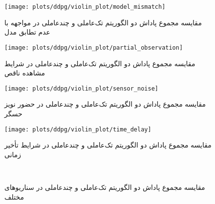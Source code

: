 \begin{figure}[H]
	\centering
	\texttt{[image: plots/ddpg/violin\_plot/model\_mismatch]}
	\caption{مقایسه مجموع پاداش دو الگوریتم تک‌عاملی و چندعاملی  در مواجهه با عدم تطابق مدل}
\end{figure}

\begin{figure}[H]
	\centering
	\texttt{[image: plots/ddpg/violin\_plot/partial\_observation]}
	\caption{مقایسه مجموع پاداش دو الگوریتم تک‌عاملی و چندعاملی  در شرایط مشاهده ناقص}
\end{figure}

\begin{figure}[H]
	\centering
	\texttt{[image: plots/ddpg/violin\_plot/sensor\_noise]}
	\caption{مقایسه مجموع پاداش دو الگوریتم تک‌عاملی و چندعاملی  در حضور نویز حسگر}
\end{figure}

\begin{figure}[H]
	\centering
	\texttt{[image: plots/ddpg/violin\_plot/time\_delay]}
	\caption{مقایسه مجموع پاداش دو الگوریتم تک‌عاملی و چندعاملی  در شرایط تأخیر زمانی}
\end{figure}



\begin{figure}[H]
	\centering
	
	\\[1ex]
	
	
	\caption{مقایسه مجموع پاداش دو الگوریتم تک‌عاملی و چندعاملی  در سناریوهای مختلف}
	\label{fig:ddpg_robustness_violin}
\end{figure}
